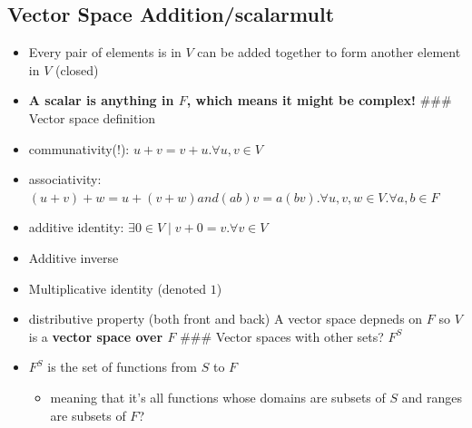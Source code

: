 \documentclass[letterpaper]{article}
\begin{document}
\subsection{Vector Space Addition/scalarmult}
\label{sec:org6de61d8}
\begin{itemize}
\item Every pair of elements is in \(V\) can be added together to form
another element in \(V\) (closed)
\item \textbf{A scalar is anything in \(F\), which means it might be complex!} \#\#\#
Vector space definition
\item communativity(!): \(u +v = v+u. \forall u, v \in V\)
\item associativity:
\((u+v)+w = u+(v+w) and (ab)v = a(bv). \forall u, v, w \in V. \forall a, b \in F\)
\item additive identity: \(\exists 0\in V \mid v + 0 = v. \forall v \in V\)
\item Additive inverse
\item Multiplicative identity (denoted \(1\))
\item distributive property (both front and back) A vector space depneds on
\(F\) so \(V\) is a \textbf{vector space over \(F\)} \#\#\# Vector spaces with
other sets? \(F^S\)
\item \(F^S\) is the set of functions from \(S\) to \(F\)

\begin{itemize}
\item meaning that it's all functions whose domains are subsets of \(S\)
and ranges are subsets of \(F\)?
\end{itemize}


\end{itemize}
\end{document}
